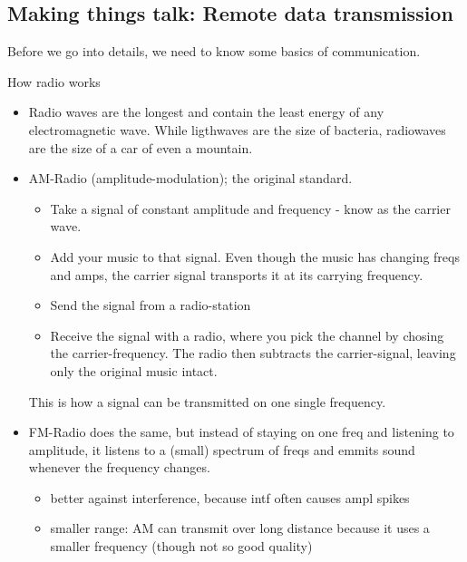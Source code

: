 \subsection{Making things talk: Remote data transmission}

Before we go into details, we need to know some basics of communication.

How radio works
\begin{itemize}
    \item Radio waves are the longest and contain the least energy of any electromagnetic wave. While ligthwaves are the size of bacteria, radiowaves are the size of a car of even a mountain.
    \item AM-Radio (amplitude-modulation); the original standard. 
        \begin{itemize}
            \item Take a signal of constant amplitude and frequency - know as the carrier wave. 
            \item Add your music to that signal. Even though the music has changing freqs and amps, the carrier signal transports it at its carrying frequency.
            \item Send the signal from a radio-station
            \item Receive the signal with a radio, where you pick the channel by chosing the carrier-frequency. The radio then subtracts the carrier-signal, leaving only the original music intact. 
        \end{itemize}
        This is how a signal can be transmitted on one single frequency. 
    \item FM-Radio does the same, but instead of staying on one freq and listening to amplitude, it listens to a (small) spectrum of freqs and emmits sound whenever the frequency changes. 
        \begin{itemize}
            \item better against interference, because intf often causes ampl spikes
            \item smaller range: AM can transmit over long distance because it uses a smaller frequency (though not so good quality)
        \end{itemize}
\end{itemize}



